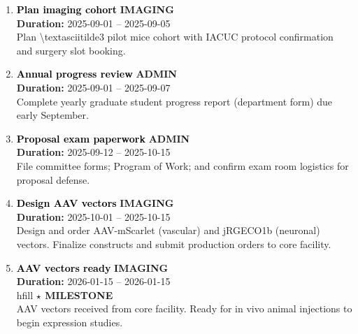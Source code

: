 \documentclass[a4paper]{article}
\newcommand{\cellcolor}[2]{\colorbox{#1}{#2}}
\begin{document}
\begin{enumerate}[leftmargin=0.3cm, itemsep=0.3em, parsep=0.1em, topsep=0.1em]
    \item \textcolor{black}{\textbf{\Large Plan imaging cohort}}
          \hfill \cellcolor{black!15}{\textbf{\small IMAGING}}
          \\ \textcolor{black!60}{\textbf{Duration:} 2025-09-01 -- 2025-09-05} \\ \textcolor{black!80}{\small Plan \textbackslash{}textasciitilde{}3 pilot mice cohort with IACUC protocol confirmation and surgery slot booking.}

    \item \textcolor{black}{\textbf{\Large Annual progress review}}
          \hfill \cellcolor{black!15}{\textbf{\small ADMIN}}
          \\ \textcolor{black!60}{\textbf{Duration:} 2025-09-01 -- 2025-09-07} \\ \textcolor{black!80}{\small Complete yearly graduate student progress report (department form) due early September.}

    \item \textcolor{black}{\textbf{\Large Proposal exam paperwork}}
          \hfill \cellcolor{black!15}{\textbf{\small ADMIN}}
          \\ \textcolor{black!60}{\textbf{Duration:} 2025-09-12 -- 2025-10-15} \\ \textcolor{black!80}{\small File committee forms; Program of Work; and confirm exam room logistics for proposal defense.}

    \item \textcolor{black}{\textbf{\Large Design AAV vectors}}
          \hfill \cellcolor{black!15}{\textbf{\small IMAGING}}
          \\ \textcolor{black!60}{\textbf{Duration:} 2025-10-01 -- 2025-10-15} \\ \textcolor{black!80}{\small Design and order AAV-mScarlet (vascular) and jRGECO1b (neuronal) vectors. Finalize constructs and submit production orders to core facility.}

    \item \textcolor{black}{\textbf{\Large AAV vectors ready}}
          \hfill \cellcolor{black!15}{\textbf{\small IMAGING}}
          \\ \textcolor{black!60}{\textbf{Duration:} 2026-01-15 -- 2026-01-15} \\hfill \textcolor{milestone}{\textbf{$\star$ MILESTONE}} \\ \textcolor{black!80}{\small AAV vectors received from core facility. Ready for in vivo animal injections to begin expression studies.}


\end{enumerate}
\end{document}
